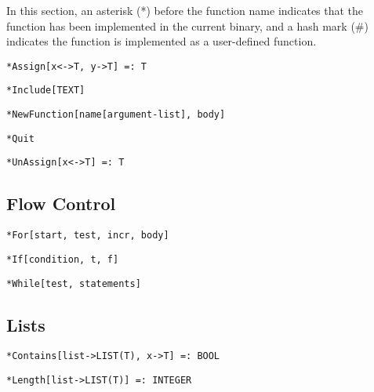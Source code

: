 \noindent In this section, an asterisk (*) before the function name indicates
that the function has been implemented in the current binary, and a
hash mark (\#) indicates the function is implemented as a user-defined
function.

\protect \large \begin{verbatim}
*Assign[x<->T, y->T] =: T
\end{verbatim} \normalsize

\protect \large \begin{verbatim}
*Include[TEXT]
\end{verbatim}\normalsize

\protect \large \begin{verbatim}
*NewFunction[name[argument-list], body]
\end{verbatim}\normalsize

\protect \large \begin{verbatim}
*Quit
\end{verbatim}\normalsize

\protect \large \begin{verbatim}
*UnAssign[x<->T] =: T
\end{verbatim}\normalsize

\medskip
\subsection{Flow Control}

\protect \large \begin{verbatim}
*For[start, test, incr, body]
\end{verbatim}\normalsize


\protect \large \begin{verbatim}
*If[condition, t, f]
\end{verbatim} \normalsize


\protect \large \begin{verbatim}
*While[test, statements]
\end{verbatim} \normalsize


\medskip
\subsection{Lists}

\protect \large \begin{verbatim}
*Contains[list->LIST(T), x->T] =: BOOL
\end{verbatim}\normalsize

\protect \large \begin{verbatim}
*Length[list->LIST(T)] =: INTEGER
\end{verbatim}\normalsize

